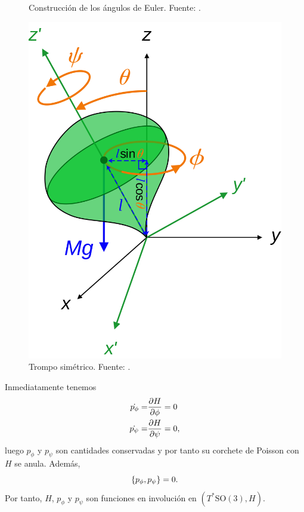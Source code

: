 \begin{ejemplo}
\begin{figure}[h]
\begin{minipage}[b]{0.4\textwidth}
    \caption{Construcción de los ángulos de Euler. Fuente: \cite{euler}.}
  \end{minipage}
  \hfill
  \begin{minipage}[b]{0.4\textwidth}
    \includegraphics[width=\textwidth]{pics/eulertop}
    \caption{Trompo simétrico. Fuente: \cite{eulertop}.}
  \end{minipage}
  \end{figure}

  Inmediatamente tenemos
  \begin{align*}
    \dot{p_{\phi}} = & \frac{\partial H}{\partial \phi} = 0 \\
    \dot{p_{\psi}} = & \frac{\partial H}{\partial \psi} = 0,
  \end{align*}
  luego $p_{\phi}$ y $p_{\psi}$ son cantidades conservadas y por tanto su corchete de Poisson con $H$ se anula. Además, 
  \begin{equation*}
    \left\lbrace p_{\phi},p_{\psi}\right\rbrace = 0.
  \end{equation*}
  Por tanto, $H$, $p_{\phi}$ y $p_{\psi}$ son funciones en involución en $(T^*\mathrm{SO}(3),H)$.


\end{ejemplo}
